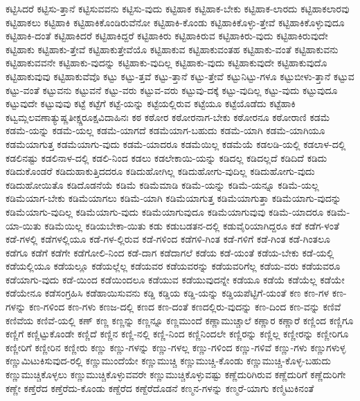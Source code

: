{ಕಟ್ಟಿಸಿದರೆ
ಕಟ್ಟಿಸು-ತ್ತಾನೆ
ಕಟ್ಟಿಸುವವನು
ಕಟ್ಟಿಸು-ವುದು
ಕಟ್ಟಿಹಾಕ
ಕಟ್ಟಿಹಾಕ-ಬೇಕು
ಕಟ್ಟಿಹಾಕ-ಲಾರದು
ಕಟ್ಟಿಹಾಕಲಾರವು
ಕಟ್ಟಿಹಾಕಲು
ಕಟ್ಟಿಹಾಕಿ
ಕಟ್ಟಿಹಾಕಿಕೊಂಡಿರುವೆನೋ
ಕಟ್ಟಿಹಾಕಿ-ಕೊಂಡು
ಕಟ್ಟಿಹಾಕಿಕೊಳ್ಳು-ತ್ತೇವೆ
ಕಟ್ಟಿಹಾಕಿಕೊಳ್ಳುವುದೂ
ಕಟ್ಟಿಹಾಕಿ-ದಂತೆ
ಕಟ್ಟಿಹಾಕಿದರೆ
ಕಟ್ಟಿಹಾಕಿದ್ದರೆ
ಕಟ್ಟಿಹಾಕಿರು
ಕಟ್ಟಿಹಾಕಿರುವ
ಕಟ್ಟಿಹಾಕಿರು-ವುದು
ಕಟ್ಟಿಹಾಕಿರುವುದೇ
ಕಟ್ಟಿಹಾಕು
ಕಟ್ಟಿಹಾಕು-ತ್ತೇವೆ
ಕಟ್ಟಿಹಾಕುತ್ತೇವೆಯೊ
ಕಟ್ಟಿಹಾಕುವ
ಕಟ್ಟಿಹಾಕುವಂತಹ
ಕಟ್ಟಿಹಾಕು-ವಂತೆ
ಕಟ್ಟಿಹಾಕುವನು
ಕಟ್ಟಿಹಾಕುವವನೇ
ಕಟ್ಟಿಹಾಕು-ವುದನ್ನು
ಕಟ್ಟಿಹಾಕು-ವುದಿಲ್ಲ
ಕಟ್ಟಿಹಾಕು-ವುದು
ಕಟ್ಟಿಹಾಕುವುದೇ
ಕಟ್ಟಿಹಾಕುವುದೊ
ಕಟ್ಟಿಹಾಕುವುವು
ಕಟ್ಟಿಹಾಕುವೆವೊ
ಕಟ್ಟು
ಕಟ್ಟು-ತ್ತವೆ
ಕಟ್ಟು-ತ್ತಾನೆ
ಕಟ್ಟು-ತ್ತೇವೆ
ಕಟ್ಟುನಿಟ್ಟು-ಗಳೂ
ಕಟ್ಟುಬೀಳು-ತ್ತಾನೆ
ಕಟ್ಟುವ
ಕಟ್ಟು-ವಂತೆ
ಕಟ್ಟುವನು
ಕಟ್ಟುವನೆ
ಕಟ್ಟು-ವರು
ಕಟ್ಟುವ-ವರು
ಕಟ್ಟುವು-ದಕ್ಕೆ
ಕಟ್ಟು-ವುದಿಲ್ಲ
ಕಟ್ಟು-ವುದು
ಕಟ್ಟುವುದೂ
ಕಟ್ಟುವುದೇ
ಕಟ್ಟುವುವು
ಕಟ್ಟೆ
ಕಟ್ಟೆಗೆ
ಕಟ್ಟೆ-ಯನ್ನು
ಕಟ್ಟೆಯಲ್ಲಿರುವ
ಕಟ್ಟೆಯೂ
ಕಟ್ಟೆಯೊಡೆದು
ಕಟ್ಟೆಹಾಕಿ
ಕಟ್ವಮ್ಲಲವಣಾತ್ಯುಷ್ಣತೀಕ್ಷ್ಣರೂಕ್ಷವಿದಾಹಿನಃ
ಕಠ
ಕಠೋರ
ಕಠೋರನಾಗ-ಬೇಕು
ಕಠೋರನೂ
ಕಠೋರಾಣಿ
ಕಡಮೆ
ಕಡಮೆ-ಯನ್ನು
ಕಡಮೆ-ಯಲ್ಲ
ಕಡಮೆ-ಯಾಗದೆ
ಕಡಮೆಯಾಗ-ಬಹುದು
ಕಡಮೆ-ಯಾಗಿ
ಕಡಮೆ-ಯಾಗಿಯೂ
ಕಡಮೆಯಾಗುತ್ತ
ಕಡಮೆಯಾಗು-ವುದು
ಕಡಮೆ-ಯಾದರೂ
ಕಡಮೆಯಿಲ್ಲ
ಕಡಮೆಯೆ
ಕಡಲಡಿ-ಯಲ್ಲಿ
ಕಡಲಾಳ-ದಲ್ಲಿ
ಕಡಲಿನಷ್ಟು
ಕಡಲಿನಾಳ-ದಲ್ಲಿ
ಕಡಲಿ-ನಿಂದ
ಕಡಲು
ಕಡಲೇಕಾಯಿ-ಯನ್ನು
ಕಡಿದಲ್ಲ
ಕಡಿದಲ್ಲದೆ
ಕಡಿದಿದೆ
ಕಡಿದು
ಕಡಿದುಕೊಂಡರೆ
ಕಡಿದುಹಾಕುತ್ತಿದದರೂ
ಕಡಿದುಹೋಗಿಲ್ಲ
ಕಡಿದುಹೋಗು-ವುದಿಲ್ಲ
ಕಡಿದುಹೋಗು-ವುದು
ಕಡಿದುಹೋಯಿತೊ
ಕಡಿದೊಡನೆಯೆ
ಕಡಿಮೆ
ಕಡಿಮೆಮಾಡಿ
ಕಡಿಮೆ-ಯನ್ನು
ಕಡಿಮೆ-ಯನ್ನೂ
ಕಡಿಮೆ-ಯಲ್ಲ
ಕಡಿಮೆಯಾಗ-ಬೇಕು
ಕಡಿಮೆಯಾಗಲು
ಕಡಿಮೆ-ಯಾಗಿ
ಕಡಿಮೆಯಾಗುತ್ತ
ಕಡಿಮೆಯಾಗುತ್ತಾ
ಕಡಿಮೆಯಾಗು-ವುದನ್ನು
ಕಡಿಮೆಯಾಗು-ವುದಿಲ್ಲ
ಕಡಿಮೆಯಾಗು-ವುದು
ಕಡಿಮೆಯಾಗುವುದೂ
ಕಡಿಮೆಯಾಗುವುವು
ಕಡಿಮೆ-ಯಾದರೂ
ಕಡಿಮೆ-ಯಾ-ಯಿತು
ಕಡಿಮೆಯಿಲ್ಲ
ಕಡಿಯಬೇಕಾ-ಯಿತು
ಕಡು
ಕಡುಬಡತನ-ದಲ್ಲಿ
ಕಡುವೈರಿಯಾಗಿದ್ದರೂ
ಕಡೆ
ಕಡೆಗ-ಳಂತೆ
ಕಡೆ-ಗಳಲ್ಲಿ
ಕಡೆಗಳಲ್ಲಿಯೂ
ಕಡೆ-ಗಳ-ಲ್ಲಿರುವ
ಕಡೆ-ಗಳಿಂದ
ಕಡೆಗಳಿ-ಗಿಂತ
ಕಡೆ-ಗಳಿಗೆ
ಕಡೆ-ಗಿಂತ
ಕಡೆ-ಗಿಂತಲೂ
ಕಡೆಗೂ
ಕಡೆಗೆ
ಕಡೆಗೇ
ಕಡೆಗೋಲಿ-ನಿಂದ
ಕಡೆ-ದಾಗ
ಕಡೆದಾಗಲೆ
ಕಡೆಯ
ಕಡೆ-ಯಂತೆ
ಕಡೆಯ-ಬೇಕು
ಕಡೆ-ಯಲ್ಲಿ
ಕಡೆಯಲ್ಲಿಯೂ
ಕಡೆಯಲ್ಲೂ
ಕಡೆಯಲ್ಲೆಲ್ಲ
ಕಡೆಯವರ
ಕಡೆಯವರನ್ನು
ಕಡೆಯವರಿಗೆಲ್ಲ
ಕಡೆಯ-ವರು
ಕಡೆಯವರೂ
ಕಡೆಯಾಗು-ವುದು
ಕಡೆ-ಯಿಂದ
ಕಡೆಯಿಂದಲೂ
ಕಡೆಯುವ
ಕಡೆಯುವುದನ್ನೇ
ಕಡೆಯೂ
ಕಡೆಯೆ
ಕಡೆಯೆಲ್ಲ
ಕಡೆಯೇ
ಕಡೆಯೇನೂ
ಕಡೆಸಂಗ್ರಹಿಸಿ
ಕಡೆಹಾಯಿಸುವನು
ಕಡ್ಡಿ
ಕಡ್ಡಿಯ
ಕಡ್ಡಿ-ಯನ್ನು
ಕಡ್ಡಿಯಪೆಟ್ಟಿಗೆ-ಯಂತೆ
ಕಣ
ಕಣ-ಗಳ
ಕಣ-ಗಳನ್ನು
ಕಣ-ಗಳಿಂದ
ಕಣ-ಗಳು
ಕಣಜ-ದಲ್ಲಿ
ಕಣದ
ಕಣ-ದಂತೆ
ಕಣದಲ್ಲಿರು-ವುದನ್ನು
ಕಣ-ದಿಂದ
ಕಣ-ವನ್ನು
ಕಣಿವೆ
ಕಣಿವೆಯ
ಕಣಿವೆ-ಯಲ್ಲಿ
ಕಣ್
ಕಣ್ಣ
ಕಣ್ಣನ್ನು
ಕಣ್ಣನ್ನೂ
ಕಣ್ಣಮುಂದೆ
ಕಣ್ಣಾಮುಚ್ಚಾಲೆ
ಕಣ್ಣಾರ
ಕಣ್ಣಾರೆ
ಕಣ್ಣಿಂದ
ಕಣ್ಣಿಗೂ
ಕಣ್ಣಿಗೆ
ಕಣ್ಣಿಟ್ಟುಕೊಂಡೇ
ಕಣ್ಣಿದೆ
ಕಣ್ಣಿನ
ಕಣ್ಣಿ-ನಲ್ಲಿ
ಕಣ್ಣಿ-ನಿಂದ
ಕಣ್ಣಿನಿಂದಲೇ
ಕಣ್ಣಿರನ್ನು
ಕಣ್ಣಿಲ್ಲ
ಕಣ್ಣೀರನ್ನು
ಕಣ್ಣೀರಿಗೂ
ಕಣ್ಣೀರಿಗೆ
ಕಣ್ಣೀರಿನ
ಕಣ್ಣೀರು
ಕಣ್ಣು
ಕಣ್ಣು-ಗಳನ್ನು
ಕಣ್ಣು-ಗಳಲ್ಲ
ಕಣ್ಣು-ಗಳಿಂದ
ಕಣ್ಣು-ಗಳಿವೆ
ಕಣ್ಣು-ಗಳು
ಕಣ್ಣುಗಳುಳ್ಳ
ಕಣ್ಣುಮಿಟುಕಿಸುವುದ-ರಲ್ಲಿ
ಕಣ್ಣುಮುಂದೆಯೇ
ಕಣ್ಣುಮುಚ್ಚಿ
ಕಣ್ಣುಮುಚ್ಚಿ-ಕೊಂಡು
ಕಣ್ಣುಮುಚ್ಚಿ-ಕೊಳ್ಳ-ಬಹುದು
ಕಣ್ಣುಮುಚ್ಚಿಕೊಳ್ಳಲು
ಕಣ್ಣುಮುಚ್ಚಿಕೊಳ್ಳುವವರೇ
ಕಣ್ಣುಮುಚ್ಚಿಕೊಳ್ಳುವಷ್ಟು
ಕಣ್ಣೆದುರಿಗಿರುವ
ಕಣ್ಣೆದುರಿಗೆ
ಕಣ್ಣೆದುರಿಗೇ
ಕಣ್ಣೇ
ಕಣ್ತೆರೆದ
ಕಣ್ತೆರೆದು-ಕೊಂಡು
ಕಣ್ದೆರೆದ
ಕಣ್ದೆರೆದೊಡನೆ
ಕಣ್ಮನ-ಗಳನ್ನು
ಕಣ್ಮರೆ-ಯಾಗು
ಕಣ್ಮಿಟುಕಿನಂತೆ
}
